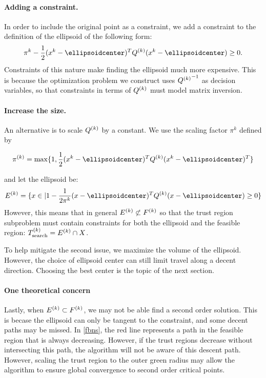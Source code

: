 
\paragraph{Adding a constraint.}
In order to include the original point as a constraint, we add a constraint to the definition of the ellipsoid of the following form:
$$ \pi^k - \frac 1 2 (x^k - \ellipsoidcenter)^T\qk(x^k - \ellipsoidcenter) \ge 0. $$
Constraints of this nature make finding the ellipsoid much more expensive.
This is because the optimization problem we construct uses ${{Q^{(k)}}}^{-1}$ as decision variables, so that constraints in terms of ${Q^{(k)}}$ must model matrix inversion.

\paragraph{Increase the size.}
An alternative is to scale ${Q^{(k)}}$ by a constant.
We use the scaling factor $\pi^k$ defined by

$$\pi^{(k)} = \max \{1, \frac 1 {2} (x^{k} - \ellipsoidcenter)^T \qk (x^{k} - \ellipsoidcenter)^T \}$$

and let the ellipsoid be:
$$\ellipsek = \{x \in \mathbb | 1 - \frac 1 {2\pi^k} (x - \ellipsoidcenter)^T \qk (x - \ellipsoidcenter) \ge 0\} $$
However, this means that in general ${E^{(k)}} \not \subset {F}^{(k)}$ so that the trust region subproblem must contain constraints for both the ellipsoid and the feasible region: ${T_{\text{search}}^{(k)}} = {E^{(k)}} \cap X$.

To help mitigate the second issue, we maximize the volume of the ellipsoid.
However, the choice of ellipsoid center can still limit travel along a decent direction.
Choosing the best center is the topic of the next section.

\paragraph{One theoretical concern}




Lastly, when ${E^{(k)}} \subset {F}^{(k)}$, we may not be able find a second order solution.
This is becase the ellipsoid can only be tangent to the constraint, and some decent paths may be missed.
In \cref{fbns}, the red line represents a path in the feasible region that is always decreasing.
However, if the trust regions decrease without intersecting this path, the algorithm will not be aware of this descent path.
However, scaling the trust region to the outer green radius may allow the algorithm to ensure global convergence to second order critical points.


